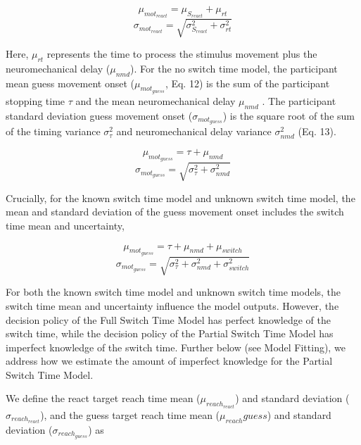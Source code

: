 \documentclass[12pt,letterpaper]{article}
\begin{document}
\begin{equation}
    \mu_{mot_{react}} = \mu_{S_{react}} + \mu_{rt}
\end{equation}
\begin{equation}
    \sigma_{mot_{react}} = \sqrt{\sigma_{S_{react}}^2 + \sigma_{rt}^2}
\end{equation}

Here, $\mu_{rt}$ represents the time to process the stimulus movement plus the neuromechanical delay ($\mu_{nmd}$).
For the no switch time model, the participant mean guess movement onset ($\mu_{mot_{guess}}$, Eq. 12) is the sum of the participant stopping time $\tau$ and the mean neuromechanical delay $\mu_{nmd}$ . The participant standard deviation guess movement onset ($\sigma_{mot_{guess}}$) is the square root of the sum of the timing variance $\sigma_{\tau}^2$ and neuromechanical delay variance $\sigma_{nmd}^2$ (Eq. 13).

\begin{equation}
    \mu_{mot_{guess}} = \tau +  \mu_{nmd}
\end{equation}
\begin{equation}
    \sigma_{mot_{guess}} = \sqrt{\sigma_{\tau}^2 + \sigma_{nmd}^2}
\end{equation}

Crucially, for the known switch time model and unknown switch time model, the mean and standard deviation of the guess movement onset includes the switch time mean and uncertainty,

\begin{equation}
    \mu_{mot_{guess}} = \tau +  \mu_{nmd} + \mu_{switch}
\end{equation}
\begin{equation}
    \sigma_{mot_{guess}} = \sqrt{\sigma_{\tau}^2 + \sigma_{nmd}^2 + \sigma_{switch}^2}
\end{equation}

For both the known switch time model and unknown switch time models, the switch time mean and uncertainty influence the model outputs. However, the decision policy of the Full Switch Time Model has perfect knowledge of the switch time, while the decision policy of the Partial Switch Time Model has imperfect knowledge of the switch time. Further below (see Model Fitting), we address how we estimate the amount of imperfect knowledge for the Partial Switch Time Model.

We define the react target reach time mean ($\mu_{reach_{react}}$) and standard deviation ($\sigma_{reach_{react}}$), and the  guess target reach time mean ($\mu_{reach}{guess}$) and standard deviation ($\sigma_{reach_{guess}}$) as
\end{document}
